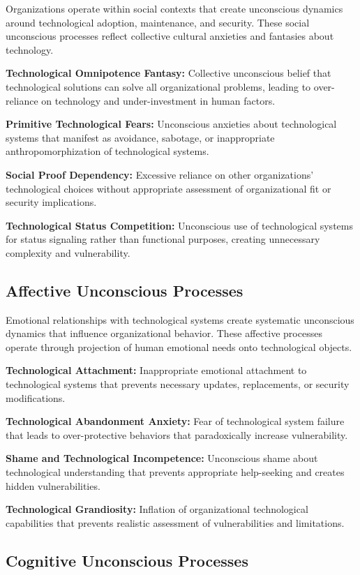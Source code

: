 \documentclass[10pt, twocolumn]{article}
\begin{document}
Organizations operate within social contexts that create unconscious dynamics around technological adoption, maintenance, and security. These social unconscious processes reflect collective cultural anxieties and fantasies about technology.

\textbf{Technological Omnipotence Fantasy:} Collective unconscious belief that technological solutions can solve all organizational problems, leading to over-reliance on technology and under-investment in human factors.

\textbf{Primitive Technological Fears:} Unconscious anxieties about technological systems that manifest as avoidance, sabotage, or inappropriate anthropomorphization of technological systems.

\textbf{Social Proof Dependency:} Excessive reliance on other organizations' technological choices without appropriate assessment of organizational fit or security implications.

\textbf{Technological Status Competition:} Unconscious use of technological systems for status signaling rather than functional purposes, creating unnecessary complexity and vulnerability.

\subsection{Affective Unconscious Processes}

Emotional relationships with technological systems create systematic unconscious dynamics that influence organizational behavior. These affective processes operate through projection of human emotional needs onto technological objects.

\textbf{Technological Attachment:} Inappropriate emotional attachment to technological systems that prevents necessary updates, replacements, or security modifications.

\textbf{Technological Abandonment Anxiety:} Fear of technological system failure that leads to over-protective behaviors that paradoxically increase vulnerability.

\textbf{Shame and Technological Incompetence:} Unconscious shame about technological understanding that prevents appropriate help-seeking and creates hidden vulnerabilities.

\textbf{Technological Grandiosity:} Inflation of organizational technological capabilities that prevents realistic assessment of vulnerabilities and limitations.

\subsection{Cognitive Unconscious Processes}
\end{document}
